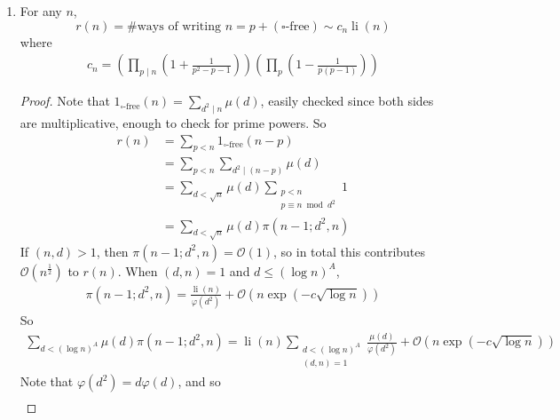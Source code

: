 \documentclass{article}
\newcommand{\1}{\mathbbm{1}}
\newcommand{\bigO}{\mathcal{O}}
\DeclareMathOperator\li{li}
\begin{document}
\begin{enumerate}
    \begin{thm}[Linnik]
      There is a constant $L$ such that $p_{a,q} \ll q^l$.
    \end{thm}
    (Xylouris 2011 gave $L=5$).
    \begin{proof}
      Non-examinable. See Iwaniec-Kowalski.
    \end{proof}
  \item
    \begin{thm}[Walfisz]
      For any $n$,
      \begin{equation*}
        r(n) = \#\text{ways of writing } n = p + (\square\text{-free}) \sim c_n \li(n)
      \end{equation*}
      where
      \begin{align*}
        c_n = \left(\prod_{p \mid n} \left(1 + \frac{1}{p^2-p-1}\right)\right)\left(\prod_p \left(1 - \frac{1}{p(p-1)}\right)\right)
      \end{align*}
    \end{thm}
    \begin{proof}
      Note that $1_{\square\text{-free}}(n) = \sum_{d^2 \mid n} \mu(d)$, easily checked since both sides are multiplicative, enough to check for prime powers.
      So
      \begin{align*}
        r(n) &= \sum_{p < n} 1_{\square\text{-free}}(n-p) \\
             &= \sum_{p < n} \sum_{d^2 \mid (n-p)} \mu(d) \\
             &= \sum_{d < \sqrt{n}} \mu(d) \sum_{\substack{p < n \\ p \equiv n \bmod{d^2}}} 1 \\
             &= \sum_{d < \sqrt{n}} \mu(d) \pi(n-1; d^2,n)
      \end{align*}
      If $(n,d) > 1$, then $\pi (n-1;d^2,n) = \bigO(1)$, so in total this contributes $\bigO(n^{\frac12})$ to $r(n)$.
      When $(d,n)  = 1$ and $d \leq (\log n)^A$,
      \begin{align*}
        \pi(n-1; d^2, n) = \frac{\li(n)}{\varphi(d^2)} + \bigO(n \exp(-c \sqrt{\log n}))
      \end{align*}
      So
      \begin{align*}
        \sum_{d < (\log n)^A} \mu(d) \pi(n-1; d^2, n) = \li(n) \sum_{\substack{d < (\log n)^A \\ (d,n)=1}} \frac{\mu(d)}{\varphi(d^2)} + \bigO(n \exp(-c \sqrt{\log n}))
      \end{align*}
      Note that $\varphi(d^2) = d \varphi(d)$, and so
      \begin{align*}

\end{align*}
\end{proof}
\end{enumerate}
\end{document}

